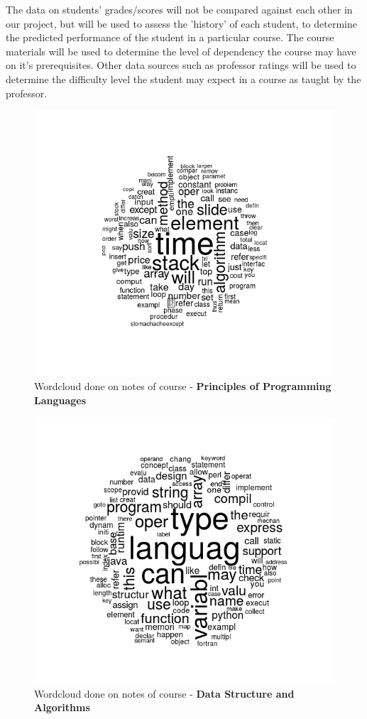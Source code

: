 \documentclass[conference]{IEEEtran}
\begin{document}
The data on students' grades/scores will not be compared against each other in our project, but will be used to assess the 'history' of each student, to determine the predicted performance of the student in a particular course. The course materials will be used to determine the level of dependency the course may have on it's prerequisites. Other data sources such as professor ratings will be used to determine the difficulty level the student may expect in a course as taught by the
professor.
\begin{figure}
	\includegraphics[width=\linewidth]{ds.png}
	\caption{Wordcloud done on notes of course - \textbf{Principles of Programming Languages}}
	\label{fig:ppl}
\end{figure}
\begin{figure}
	\includegraphics[width=\linewidth]{ppl.png}
	\caption{Wordcloud done on notes of course -\textbf{ Data Structure and Algorithms} }
	\label{fig:ds}
\end{figure}
\end{document}
